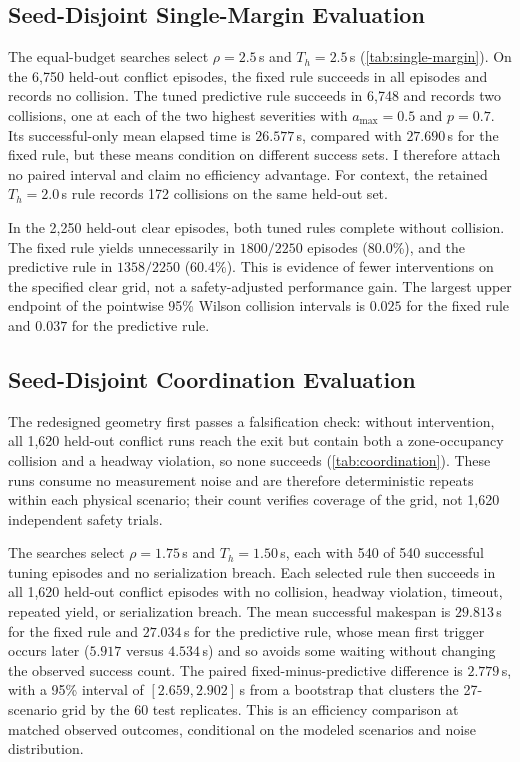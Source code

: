 \subsection{Seed-Disjoint Single-Margin Evaluation}

The equal-budget searches select $\rho=2.5$\,s and $T_h=2.5$\,s
(\cref{tab:single-margin}).  On the 6,750 held-out conflict episodes, the fixed
rule succeeds in all episodes and records no collision.  The tuned predictive
rule succeeds in 6,748 and records two collisions, one at each of the two highest
severities with $a_{\max}=0.5$ and $p=0.7$.  Its successful-only mean elapsed
time is $26.577$\,s, compared with $27.690$\,s for the fixed rule, but these
means condition on different success sets.  I therefore attach no paired
interval and claim no efficiency advantage.  For context, the retained
$T_h=2.0$\,s rule records 172 collisions on the same held-out set.



In the 2,250 held-out clear episodes, both tuned rules complete without
collision.  The fixed rule yields unnecessarily in $1800/2250$ episodes
(80.0\%), and the predictive rule in $1358/2250$ (60.4\%).  This is evidence of
fewer interventions on the specified clear grid, not a safety-adjusted
performance gain.  The largest upper endpoint of the pointwise 95\% Wilson
collision intervals is $0.025$ for the fixed rule and $0.037$ for the
predictive rule.

\subsection{Seed-Disjoint Coordination Evaluation}

The redesigned geometry first passes a falsification check: without
intervention, all 1,620 held-out conflict runs reach the exit but contain both a
zone-occupancy collision and a headway violation, so none succeeds
(\cref{tab:coordination}).  These runs consume no measurement noise and are
therefore deterministic repeats within each physical scenario; their count
verifies coverage of the grid, not 1,620 independent safety trials.



The searches select $\rho=1.75$\,s and $T_h=1.50$\,s, each with 540 of 540
successful tuning episodes and no serialization breach.  Each selected rule then
succeeds in all 1,620 held-out conflict episodes with no collision, headway
violation, timeout, repeated yield, or serialization breach.  The mean
successful makespan is $29.813$\,s for the fixed rule and $27.034$\,s for the
predictive rule, whose mean first trigger occurs later ($5.917$ versus
$4.534$\,s) and so avoids some waiting without changing the observed success
count.  The paired fixed-minus-predictive difference is $2.779$\,s, with a 95\%
interval of $[2.659,2.902]$\,s from a bootstrap that clusters the 27-scenario
grid by the 60 test replicates.  This is an efficiency comparison at matched
observed outcomes, conditional on the modeled scenarios and noise distribution.

